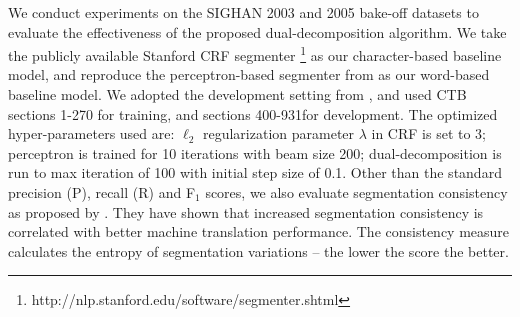 We conduct experiments  on the SIGHAN 2003 \cite{Sproat:2003:SIGHAN} and 2005 \cite{Emerson:2005:SIGHAN} bake-off datasets to evaluate the effectiveness of the proposed dual-decomposition algorithm. We take the publicly available Stanford CRF segmenter \cite{Tseng:2005:SIGHAN}\footnote{http://nlp.stanford.edu/software/segmenter.shtml} as our character-based baseline model, and reproduce the perceptron-based segmenter from  as our word-based baseline model.
We adopted the development setting from \cite{Zhang:2007:ACL}, and used CTB sections 1-270 for training, and sections 400-931for development. The optimized hyper-parameters used are: $\ell_{2}$ regularization parameter $\lambda$ in CRF is set to $3$; perceptron is trained for 10 iterations with beam size 200; dual-decomposition is run to max iteration of 100 with initial step size of 0.1. Other than the standard precision (P), recall (R) and F$_1$ scores, we also evaluate segmentation consistency as proposed by \cite{Chang:2008:ACL}. They have shown that increased segmentation consistency is correlated with better machine translation performance. The consistency measure calculates the entropy of segmentation variations -- the lower the score the better.

